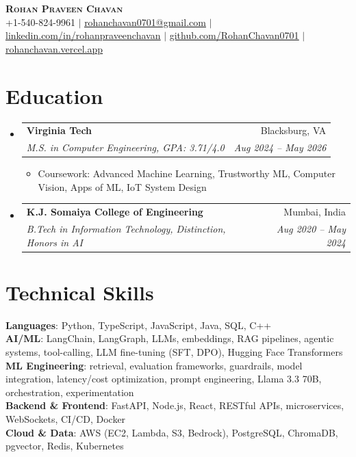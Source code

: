 \documentclass[letterpaper,10pt]{article}
\makeatletter
\newcommand{\resumeItem}[1]{
  \item\small{#1 \vspace{-2.5pt}}
}
\newcommand{\resumeSubheading}[4]{
  \vspace{-2pt}\item
    \begin{tabular*}{0.97\textwidth}[t]{l@{\extracolsep{\fill}}r}
      \textbf{#1} & #2 \\
      \textit{\small#3} & \textit{\small #4} \\
    \end{tabular*}\vspace{-7pt}
}
\newcommand{\resumeSubHeadingListStart}{\begin{itemize}[leftmargin=0.15in, label={}]}
\newcommand{\resumeSubHeadingListEnd}{\end{itemize}}
\newcommand{\resumeItemListStart}{\begin{itemize}}
\newcommand{\resumeItemListEnd}{\end{itemize}\vspace{-5pt}}
\makeatother
\begin{document}
\begin{center}
    \textbf{\Huge \scshape Rohan Praveen Chavan} \\ \vspace{2pt}
    \small +1-540-824-9961 $|$
    \href{mailto:rohanchavan0701@gmail.com}{\underline{rohanchavan0701@gmail.com}} $|$
    \href{https://linkedin.com/in/rohanpraveenchavan}{\underline{linkedin.com/in/rohanpraveenchavan}} $|$
    \href{https://github.com/RohanChavan0701}{\underline{github.com/RohanChavan0701}} $|$
    \href{https://rohanchavan.vercel.app}{\underline{rohanchavan.vercel.app}}
\end{center}

\section{Education}
\resumeSubHeadingListStart
    \resumeSubheading
      {Virginia Tech}{Blacksburg, VA}
      {M.S. in Computer Engineering, GPA: 3.71/4.0}{Aug 2024 -- May 2026}
      \resumeItemListStart
        \resumeItem{Coursework: Advanced Machine Learning, Trustworthy ML, Computer Vision, Apps of ML, IoT System Design}
      \resumeItemListEnd
    \resumeSubheading
      {K.J. Somaiya College of Engineering}{Mumbai, India}
      {B.Tech in Information Technology, Distinction, Honors in AI}{Aug 2020 -- May 2024}
\resumeSubHeadingListEnd

\section{Technical Skills}
\begin{itemize}[leftmargin=0.15in, label={}]
    \small{\item{
     \textbf{Languages}{: Python, TypeScript, JavaScript, Java, SQL, C++} \\
     \textbf{AI/ML}{: LangChain, LangGraph, LLMs, embeddings, RAG pipelines, agentic systems,
       tool-calling, LLM fine-tuning (SFT, DPO), Hugging Face Transformers} \\
     \textbf{ML Engineering}{: retrieval, evaluation frameworks, guardrails, model integration,
       latency/cost optimization, prompt engineering, Llama 3.3 70B, orchestration, experimentation} \\
     \textbf{Backend \& Frontend}{: FastAPI, Node.js, React, RESTful APIs, microservices,
       WebSockets, CI/CD, Docker} \\
     \textbf{Cloud \& Data}{: AWS (EC2, Lambda, S3, Bedrock), PostgreSQL, ChromaDB, pgvector, Redis, Kubernetes}
    }}
\end{itemize}
\end{document}
